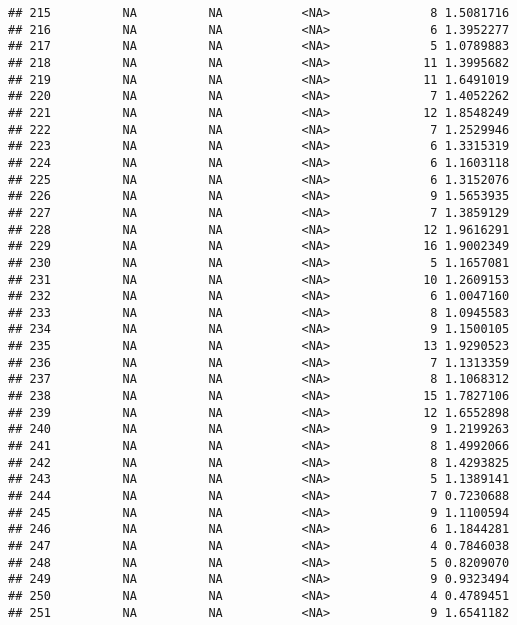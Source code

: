 \documentclass[]{article}
\begin{document}
\begin{verbatim}
## 215          NA          NA           <NA>              8 1.5081716
## 216          NA          NA           <NA>              6 1.3952277
## 217          NA          NA           <NA>              5 1.0789883
## 218          NA          NA           <NA>             11 1.3995682
## 219          NA          NA           <NA>             11 1.6491019
## 220          NA          NA           <NA>              7 1.4052262
## 221          NA          NA           <NA>             12 1.8548249
## 222          NA          NA           <NA>              7 1.2529946
## 223          NA          NA           <NA>              6 1.3315319
## 224          NA          NA           <NA>              6 1.1603118
## 225          NA          NA           <NA>              6 1.3152076
## 226          NA          NA           <NA>              9 1.5653935
## 227          NA          NA           <NA>              7 1.3859129
## 228          NA          NA           <NA>             12 1.9616291
## 229          NA          NA           <NA>             16 1.9002349
## 230          NA          NA           <NA>              5 1.1657081
## 231          NA          NA           <NA>             10 1.2609153
## 232          NA          NA           <NA>              6 1.0047160
## 233          NA          NA           <NA>              8 1.0945583
## 234          NA          NA           <NA>              9 1.1500105
## 235          NA          NA           <NA>             13 1.9290523
## 236          NA          NA           <NA>              7 1.1313359
## 237          NA          NA           <NA>              8 1.1068312
## 238          NA          NA           <NA>             15 1.7827106
## 239          NA          NA           <NA>             12 1.6552898
## 240          NA          NA           <NA>              9 1.2199263
## 241          NA          NA           <NA>              8 1.4992066
## 242          NA          NA           <NA>              8 1.4293825
## 243          NA          NA           <NA>              5 1.1389141
## 244          NA          NA           <NA>              7 0.7230688
## 245          NA          NA           <NA>              9 1.1100594
## 246          NA          NA           <NA>              6 1.1844281
## 247          NA          NA           <NA>              4 0.7846038
## 248          NA          NA           <NA>              5 0.8209070
## 249          NA          NA           <NA>              9 0.9323494
## 250          NA          NA           <NA>              4 0.4789451
## 251          NA          NA           <NA>              9 1.6541182

\end{verbatim}
\end{document}
